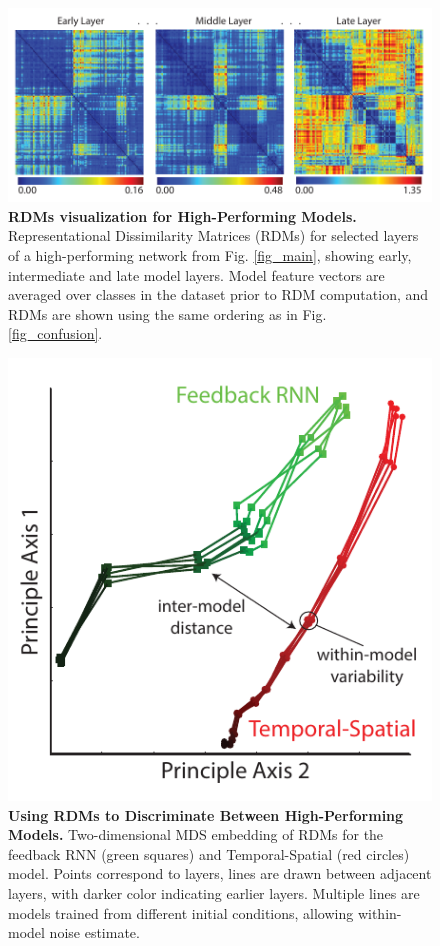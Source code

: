 \begin{figure}
\FigCenter
\includegraphics [width=\DefaultFigSize\linewidth]{figures/rdms.pdf}
\vspace{-5mm}
\caption{\footnotesize{\textbf{RDMs visualization for High-Performing Models.} Representational Dissimilarity Matrices (RDMs) for selected layers of a high-performing network from Fig. \ref{fig_main}, showing early, intermediate and late model layers.  Model feature vectors are averaged over classes in the dataset prior to RDM computation, and RDMs are shown using the same ordering as in Fig. \ref{fig_confusion}.}~\label{fig_rdms}}
\vspace{-5mm}
\end{figure}

\begin{figure}
\FigCenter
\includegraphics [width=\SmallFigSize\linewidth]{figures/rdm_embd.pdf}
\vspace{-5mm}
\caption{\footnotesize{\textbf{Using RDMs to Discriminate Between High-Performing Models.} Two-dimensional MDS embedding of RDMs for the feedback RNN (green squares) and Temporal-Spatial (red circles) model.  Points correspond to layers, lines are drawn between adjacent layers, with darker color indicating earlier layers.  Multiple lines are models trained from different initial conditions, allowing within-model noise estimate.}~\label{fig_rdmsembd}}
\vspace{-5mm}
\end{figure}
